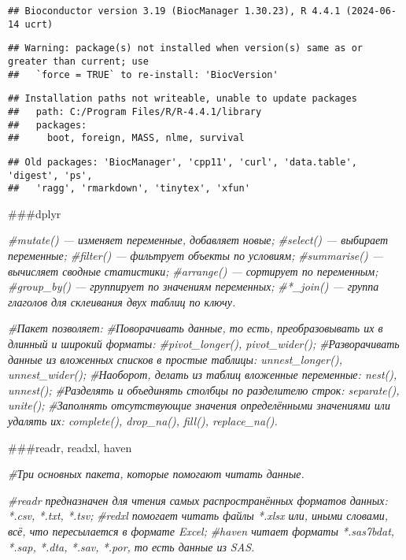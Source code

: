 \documentclass[
]{article}
\newenvironment{Shaded}{\begin{snugshade}}{\end{snugshade}}
\newcommand{\CommentTok}[1]{\textcolor[rgb]{0.56,0.35,0.01}{\textit{#1}}}
\begin{document}
\begin{verbatim}
## Bioconductor version 3.19 (BiocManager 1.30.23), R 4.4.1 (2024-06-14 ucrt)
\end{verbatim}

\begin{verbatim}
## Warning: package(s) not installed when version(s) same as or greater than current; use
##   `force = TRUE` to re-install: 'BiocVersion'
\end{verbatim}

\begin{verbatim}
## Installation paths not writeable, unable to update packages
##   path: C:/Program Files/R/R-4.4.1/library
##   packages:
##     boot, foreign, MASS, nlme, survival
\end{verbatim}

\begin{verbatim}
## Old packages: 'BiocManager', 'cpp11', 'curl', 'data.table', 'digest', 'ps',
##   'ragg', 'rmarkdown', 'tinytex', 'xfun'
\end{verbatim}

\#\#\#dplyr

\begin{Shaded}
\begin{Highlighting}[]
\CommentTok{\#mutate() — изменяет переменные, добавляет новые;}
\CommentTok{\#select() — выбирает переменные;}
\CommentTok{\#filter() — фильтрует объекты по условиям;}
\CommentTok{\#summarise() — вычисляет сводные статистики;}
\CommentTok{\#arrange() — сортирует по переменным;}
\CommentTok{\#group\_by() — группирует по значениям переменных;}
\CommentTok{\#*\_join() — группа глаголов для склеивания двух таблиц по ключу.}

\CommentTok{\#Пакет позволяет:}
\CommentTok{\#Поворачивать данные, то есть, преобразовывать их в длинный и широкий форматы: \#pivot\_longer(), pivot\_wider();}
\CommentTok{\#Разворачивать данные из вложенных списков в простые таблицы: unnest\_longer(), unnest\_wider();}
\CommentTok{\#Наоборот, делать из таблиц вложенные переменные: nest(), unnest();}
\CommentTok{\#Разделять и объединять столбцы по разделителю строк: separate(), unite();}
\CommentTok{\#Заполнять отсутствующие значения определёнными значениями или удалять их: complete(), drop\_na(), fill(), replace\_na().}
\end{Highlighting}
\end{Shaded}

\#\#\#readr, readxl, haven

\begin{Shaded}
\begin{Highlighting}[]
\CommentTok{\#Три основных пакета, которые помогают читать данные.}

\CommentTok{\#readr предназначен для чтения самых распространённых форматов данных: *.csv, *.txt, *.tsv;}
\CommentTok{\#redxl помогает читать файлы *.xlsx или, иными словами, всё, что пересылается в формате Excel;}
\CommentTok{\#haven читает форматы *.sas7bdat, *.sap, *.dta, *.sav, *.por, то есть данные из SAS.}
\end{Highlighting}
\end{Shaded}
\end{document}
